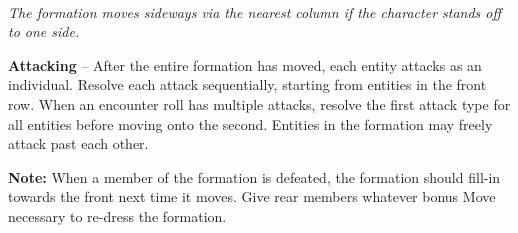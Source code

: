 \begin{center}
\\
\emph{The formation moves sideways via the nearest column if the character stands off to one side.}
\end{center}

\textbf{Attacking} -- After the entire formation has moved, each entity attacks as an individual. Resolve each attack sequentially, starting from entities in the front row. When an encounter roll has multiple attacks, resolve the first attack type for all entities before moving onto the second. Entities in the formation may freely attack past each other.

\begin{tcolorbox}
\textbf{Note:} When a member of the formation is defeated, the formation should fill-in towards the front next time it moves. Give rear members whatever bonus Move necessary to re-dress the formation.
\end{tcolorbox}

\pagebreak


